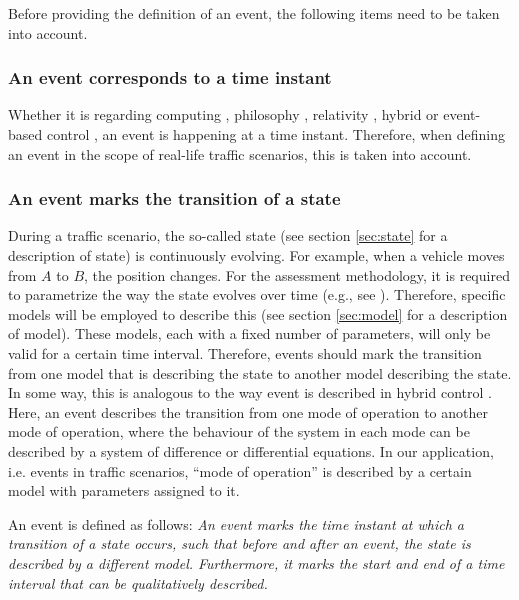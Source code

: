 Before providing the definition of an event, the following items need to be taken into account.

\subsubsection{An event corresponds to a time instant}
Whether it is regarding computing \cite{breu1997towards}, philosophy \cite{kim1993supervenience}, relativity \cite{sartori1996understanding}, hybrid or event-based control \cite{branicky1998hybridcontrol, deschutter2003hybrid, heemels2012eventcontrol}, an event is happening at a time instant. Therefore, when defining an event in the scope of real-life traffic scenarios, this is taken into account.

\subsubsection{An event marks the transition of a state}
During a traffic scenario, the so-called state (see section \ref{sec:state} for a description of state) is continuously evolving. For example, when a vehicle moves from $A$ to $B$, the position changes. For the assessment methodology, it is required to parametrize the way the state evolves over time (e.g., see \cite{deGelder2017assessment}). Therefore, specific models will be employed to describe this (see section \ref{sec:model} for a description of model). These models, each with a fixed number of parameters, will only be valid for a certain time interval. Therefore, events should mark the transition from one model that is describing the state to another model describing the state. In some way, this is analogous to the way event is described in hybrid control \cite{deschutter2003hybrid}. Here, an event describes the transition from one mode of operation to another mode of operation, where the behaviour of the system in each mode can be described by a system of difference or differential equations. In our application, i.e. events in traffic scenarios, ``mode of operation'' is described by a certain model with parameters assigned to it.

An event is defined as follows: \emph{An event marks the time instant at which a transition of a state occurs, such that before and after an event, the state is described by a different model. Furthermore, it marks the start and end of a time interval that can be qualitatively described.}
